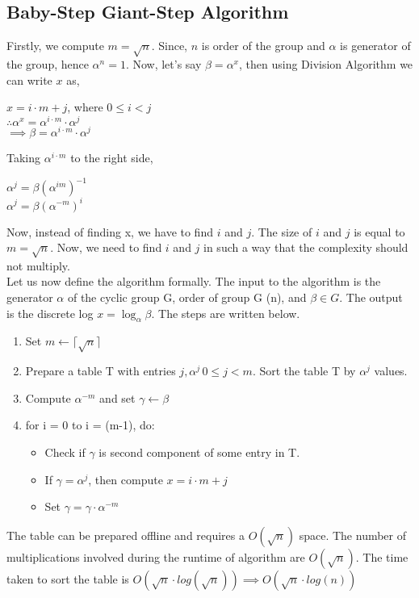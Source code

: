 \documentclass[11pt]{article}
\begin{document}
\subsection{Baby-Step Giant-Step Algorithm}
Firstly, we compute $m = \sqrt{n}$. Since, $n$ is order of the group and $\alpha$ is generator of the group, hence $\alpha^n = 1$. Now, let's say $\beta = \alpha^x$, then using Division Algorithm we can write $x$ as,
\begin{center}
    $x = i \cdot m + j$, where $0 \leq i < j$\\
    \vspace{1mm}
    $\therefore \alpha^x = \alpha^{i\cdot m} \cdot \alpha^j $\\
    \vspace{1mm}
    $\implies \beta = \alpha^{i\cdot m} \cdot \alpha^j $
\end{center}
Taking $\alpha^{i\cdot m}$ to the right side,
\begin{center}
    $\alpha^j = \beta {(\alpha^{im})}^{-1}$\\
    \vspace{1mm}
    $\alpha^j = \beta {(\alpha^{-m})}^i$
\end{center}
Now, instead of finding x, we have to find $i$ and $j$. The size of $i$ and $j$ is equal to $m = \sqrt{n}$. Now, we need to find $i$ and $j$ in such a way that the complexity should not multiply.\\
\newline
Let us now define the algorithm formally. The input to the algorithm is the generator $\alpha$ of the cyclic group G, order of group G (n), and $\beta \in G$. The output is the discrete log $x = \log_{\alpha}{\beta}$. The steps are written below.
\begin{enumerate}
    \item Set $m \leftarrow \lceil \sqrt{n} \rceil$
    \item Prepare a table T with entries $j, \alpha^j \, 0 \leq j < m$. Sort the table T by $\alpha^j$ values.
    \item Compute $\alpha^{-m}$ and set $\gamma \leftarrow \beta$
    \item for i = 0 to i = (m-1), do:
    \begin{itemize}
        \item Check if $\gamma$ is second component of some entry in T.
        \item If $\gamma = \alpha^j$, then compute $x = i\cdot m + j$
        \item Set $\gamma = \gamma \cdot \alpha^{-m}$
    \end{itemize}
\end{enumerate}
The table can be prepared offline and requires a $O(\sqrt{n})$ space. The number of multiplications involved during the runtime of algorithm are $O(\sqrt{n})$. The time taken to sort the table is $O(\sqrt{n} \cdot log(\sqrt{n})) \implies O(\sqrt{n} \cdot log(n))$
\end{document}
